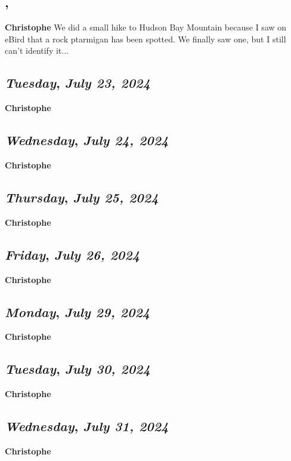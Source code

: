 \subsection*{\weekday, \day}
\textbf {Christophe}
We did a small hike to Hudson Bay Mountain because I saw on eBird that a rock ptarmigan has been spotted. We finally saw one,  but I still can't identify it...

\def\day{\textit{July 23, 2024}}
\def\weekday{\textit{Tuesday}}
\subsection*{\weekday, \day}
\textbf {Christophe}

\def\day{\textit{July 24, 2024}}
\def\weekday{\textit{Wednesday}}
\subsection*{\weekday, \day}
\textbf {Christophe}

\def\day{\textit{July 25, 2024}}
\def\weekday{\textit{Thursday}}
\subsection*{\weekday, \day}
\textbf {Christophe}

\def\day{\textit{July 26, 2024}}
\def\weekday{\textit{Friday}}
\subsection*{\weekday, \day}
\textbf {Christophe}



\def\day{\textit{July 29, 2024}}
\def\weekday{\textit{Monday}}
\subsection*{\weekday, \day}
\textbf {Christophe}

\def\day{\textit{July 30, 2024}}
\def\weekday{\textit{Tuesday}}
\subsection*{\weekday, \day}
\textbf {Christophe}

\def\day{\textit{July 31, 2024}}
\def\weekday{\textit{Wednesday}}
\subsection*{\weekday, \day}
\textbf {Christophe}
